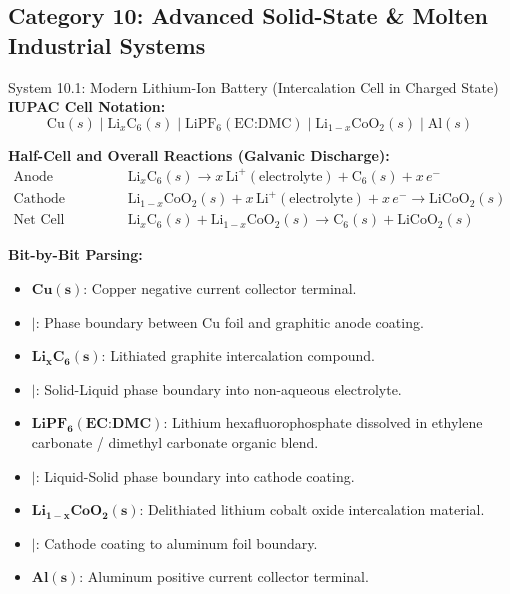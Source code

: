 \documentclass[10pt,a4paper]{article}
\begin{document}
\subsection{Category 10: Advanced Solid-State \& Molten Industrial Systems}
\begin{examplebox}{System 10.1: Modern Lithium-Ion Battery (Intercalation Cell in Charged State)}
\textbf{IUPAC Cell Notation:}
\begin{equation*}
    \text{Cu}(s) \mid \text{Li}_x\text{C}_6(s) \mid \text{LiPF}_6(\text{EC:DMC}) \mid \text{Li}_{1-x}\text{CoO}_2(s) \mid \text{Al}(s)
\end{equation*}

\textbf{Half-Cell and Overall Reactions (Galvanic Discharge):}
\begin{align*}
    \text{Anode (Oxidation / De-intercalation):} \quad & \text{Li}_x\text{C}_6(s) \longrightarrow x\,\text{Li}^+(\text{electrolyte}) + \text{C}_6(s) + x\,e^- \\
    \text{Cathode (Reduction / Intercalation):} \quad & \text{Li}_{1-x}\text{CoO}_2(s) + x\,\text{Li}^+(\text{electrolyte}) + x\,e^- \longrightarrow \text{LiCoO}_2(s) \\
    \text{Net Cell Reaction:} \quad & \text{Li}_x\text{C}_6(s) + \text{Li}_{1-x}\text{CoO}_2(s) \longrightarrow \text{C}_6(s) + \text{LiCoO}_2(s)
\end{align*}

\textbf{Bit-by-Bit Parsing:}
\begin{itemize}[leftmargin=*]
    \item $\mathbf{Cu(s)}$: Copper negative current collector terminal.
    \item $\mathbf{\mid}$: Phase boundary between Cu foil and graphitic anode coating.
    \item $\mathbf{Li_xC_6(s)}$: Lithiated graphite intercalation compound.
    \item $\mathbf{\mid}$: Solid-Liquid phase boundary into non-aqueous electrolyte.
    \item $\mathbf{LiPF_6(\text{EC:DMC})}$: Lithium hexafluorophosphate dissolved in ethylene carbonate / dimethyl carbonate organic blend.
    \item $\mathbf{\mid}$: Liquid-Solid phase boundary into cathode coating.
    \item $\mathbf{Li_{1-x}CoO_2(s)}$: Delithiated lithium cobalt oxide intercalation material.
    \item $\mathbf{\mid}$: Cathode coating to aluminum foil boundary.
    \item $\mathbf{Al(s)}$: Aluminum positive current collector terminal.
\end{itemize}
\end{examplebox}
\end{document}
